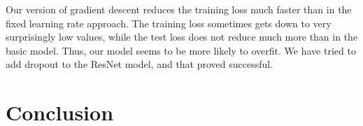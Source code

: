 \documentclass{article}
\begin{document}
  Our version of gradient descent reduces the training loss much faster than in the fixed learning rate approach. The training loss sometimes gets down to very surprisingly low values, while the test loss does not reduce much more than in the basic model. Thus, our model seems to be more likely to overfit. We have tried to add dropout to the ResNet model, and that proved successful. 
  
  \section{Conclusion}
  
  
  
  
  
  
  
\end{document}

